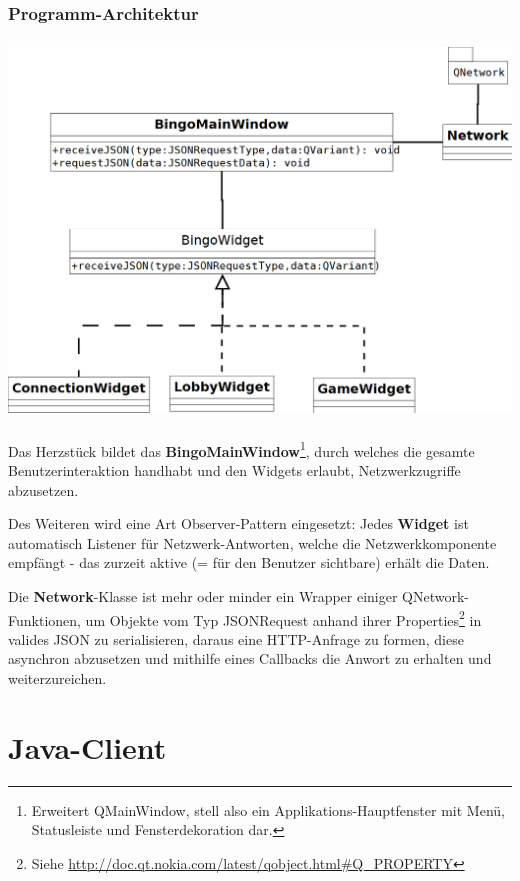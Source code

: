 \documentclass[12pt, a4paper]{scrartcl}
\begin{document}
\subsubsection{Programm-Architektur}
\begin{center}
\includegraphics[height=10cm]{qt-klassendiagramm.png}
\end{center}
\np

Das Herzstück bildet das \textbf{BingoMainWindow}\footnote{Erweitert QMainWindow, stell also ein Applikations-Hauptfenster mit Menü, Statusleiste und Fensterdekoration dar.}, durch welches die gesamte Benutzerinteraktion handhabt und den Widgets erlaubt, Netzwerkzugriffe abzusetzen.\np

Des Weiteren wird eine Art Observer-Pattern eingesetzt: Jedes \textbf{Widget} ist automatisch Listener
für Netzwerk-Antworten, welche die Netzwerkkomponente empfängt - das zurzeit aktive (= für den Benutzer sichtbare) erhält die Daten.\np

Die \textbf{Network}-Klasse ist mehr oder minder ein Wrapper einiger QNetwork-Funktionen, um Objekte vom Typ JSONRequest anhand ihrer Properties\footnote{Siehe \url{http://doc.qt.nokia.com/latest/qobject.html\#Q_PROPERTY}} in valides JSON zu serialisieren, daraus eine HTTP-Anfrage zu formen, diese asynchron abzusetzen und mithilfe eines Callbacks die Anwort zu erhalten und weiterzureichen.

\clearpage
\section{Java-Client}
\end{document}
